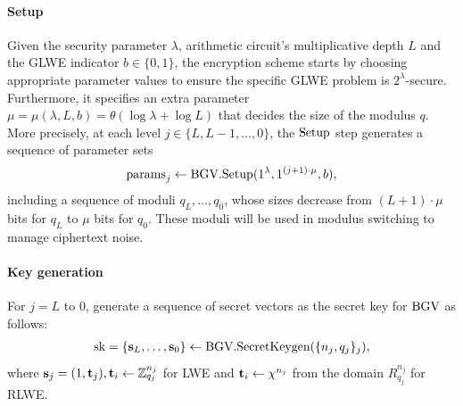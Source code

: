 \documentclass[../main.tex]{subfiles}
\begin{document}
\paragraph{Setup} Given the security parameter $\lambda$, arithmetic circuit's multiplicative depth $L$ and the GLWE indicator $b \in \{0,1\}$, the encryption scheme starts by choosing appropriate parameter values to ensure the specific GLWE problem is $2^{\lambda}$-secure. Furthermore, it specifies an extra parameter $\mu=\mu(\lambda,L,b)=\theta(\log \lambda + \log L)$ that decides the size of the modulus $q$. More precisely, at each level $j \in \{L, L-1, \dots, 0\}$, %
the $\text{Setup}$ step generates a sequence of parameter sets
\begin{align*}
    \para_j \leftarrow \bgv.\setup(1^{\lambda},1^{(j+1)\cdot \mu},b), %
\end{align*}
including a sequence of moduli $q_L, \dots, q_0$, whose sizes decrease from $(L+1) \cdot \mu$ bits for $q_L$ to $\mu$ bits for $q_0$. These moduli will be used in modulus switching to manage ciphertext noise. 

\paragraph{Key generation} For $j=L$ to 0, generate %
a sequence of secret vectors as the secret key for $\text{BGV}$ as follows: %
\begin{align*}
    \text{sk} = \{\mathbf{s}_L, \dots, \mathbf{s}_0\} \leftarrow \text{BGV}.\text{SecretKeygen}(\{ n_j,q_j \}_j),
\end{align*}
where $\mathbf{s}_j = (1,\mathbf{t}_j), \mathbf{t}_i \leftarrow \mathbb{Z}^{n_j}_{q_j}$ for LWE and $\mathbf{t}_i \leftarrow \chi^{n_j}$ from the domain $R^{n_j}_{q_j}$ for RLWE.
\end{document}
